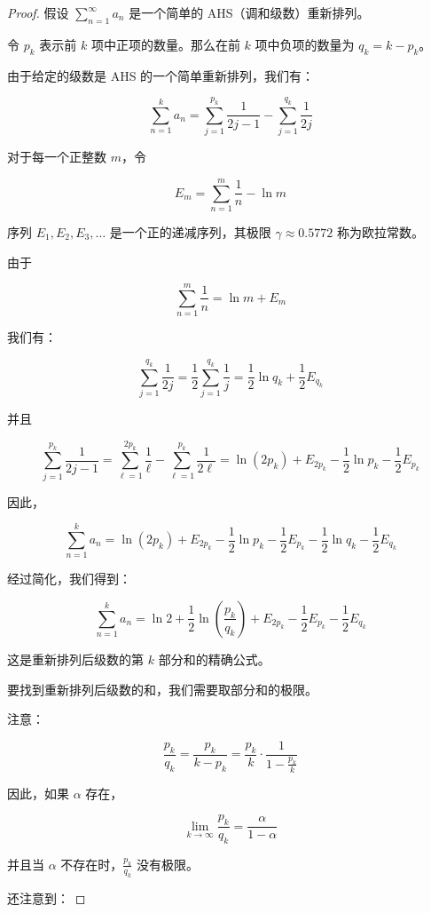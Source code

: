 \documentclass{ctexart}
\begin{document}
\begin{proof}

假设 \(\sum_{n=1}^{\infty} a_n\) 是一个简单的 AHS（调和级数）重新排列。

令 \(p_k\) 表示前 \(k\) 项中正项的数量。那么在前 \(k\) 项中负项的数量为 \(q_k = k - p_k\)。

由于给定的级数是 AHS 的一个简单重新排列，我们有：

\[
\sum_{n=1}^{k} a_n = \sum_{j=1}^{p_k} \frac{1}{2j-1} - \sum_{j=1}^{q_k} \frac{1}{2j}
\]

对于每一个正整数 \(m\)，令

\[
E_m = \sum_{n=1}^{m} \frac{1}{n} - \ln m
\]

序列 \(E_1, E_2, E_3, \dots\) 是一个正的递减序列，其极限 \(\gamma \approx 0.5772\) 称为欧拉常数。

由于

\[
\sum_{n=1}^{m} \frac{1}{n} = \ln m + E_m
\]

我们有：

\[
\sum_{j=1}^{q_k} \frac{1}{2j} = \frac{1}{2} \sum_{j=1}^{q_k} \frac{1}{j} = \frac{1}{2} \ln q_k + \frac{1}{2} E_{q_k}
\]

并且

\[
\sum_{j=1}^{p_k} \frac{1}{2j-1} = \sum_{\ell=1}^{2p_k} \frac{1}{\ell} - \sum_{\ell=1}^{p_k} \frac{1}{2\ell} = \ln(2p_k) + E_{2p_k} - \frac{1}{2} \ln p_k - \frac{1}{2} E_{p_k}
\]

因此，

\[
\sum_{n=1}^{k} a_n = \ln(2p_k) + E_{2p_k} - \frac{1}{2} \ln p_k - \frac{1}{2} E_{p_k} - \frac{1}{2} \ln q_k - \frac{1}{2} E_{q_k}
\]

经过简化，我们得到：

\[
\sum_{n=1}^{k} a_n = \ln 2 + \frac{1}{2} \ln \left(\frac{p_k}{q_k}\right) + E_{2p_k} - \frac{1}{2} E_{p_k} - \frac{1}{2} E_{q_k}
\]

这是重新排列后级数的第 \(k\) 部分和的精确公式。

要找到重新排列后级数的和，我们需要取部分和的极限。

注意：

\[
\frac{p_k}{q_k} = \frac{p_k}{k - p_k} = \frac{p_k}{k} \cdot \frac{1}{1 - \frac{p_k}{k}}
\]

因此，如果 \(\alpha\) 存在，

\[
\lim_{k \to \infty} \frac{p_k}{q_k} = \frac{\alpha}{1 - \alpha}
\]

并且当 \(\alpha\) 不存在时，\(\frac{p_k}{q_k}\) 没有极限。

还注意到：


\end{proof}
\end{document}
